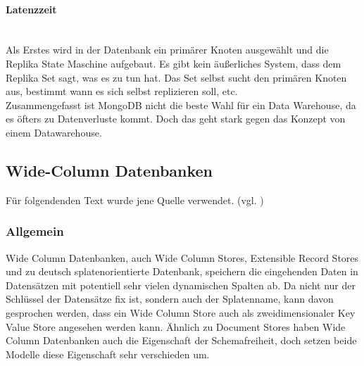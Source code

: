 \paragraph{Latenzzeit}\mbox{} \\
Als Erstes wird in der Datenbank ein primärer Knoten ausgewählt und die Replika State Maschine aufgebaut. Es gibt kein äußerliches System, dass dem Replika Set sagt, was es zu tun hat. Das Set selbst sucht den primären Knoten aus, bestimmt wann es sich selbst replizieren soll, etc.\\

Zusammengefasst ist MongoDB nicht die beste Wahl für ein Data Warehouse, da es öfters zu Datenverluste kommt. Doch das geht stark gegen das Konzept von einem Datawarehouse. 
\newpage
\subsection{Wide-Column Datenbanken}
Für folgendenden Text wurde jene Quelle verwendet. (vgl. \cite{dbengines_wide_2020})
\subsubsection{Allgemein}
Wide Column Datenbanken, auch Wide Column Stores, Extensible Record Stores und zu deutsch splatenorientierte Datenbank, speichern die eingehenden Daten in Datensätzen mit potentiell sehr vielen dynamischen Spalten ab. Da nicht nur der Schlüssel der Datensätze fix ist, sondern auch der Splatenname, kann davon gesprochen werden, dass ein Wide Column Store auch als zweidimensionaler Key Value Store angesehen werden kann. Ähnlich zu Document Stores haben Wide Column Datenbanken auch die Eigenschaft der Schemafreiheit, doch setzen beide Modelle diese Eigenschaft sehr verschieden um.
